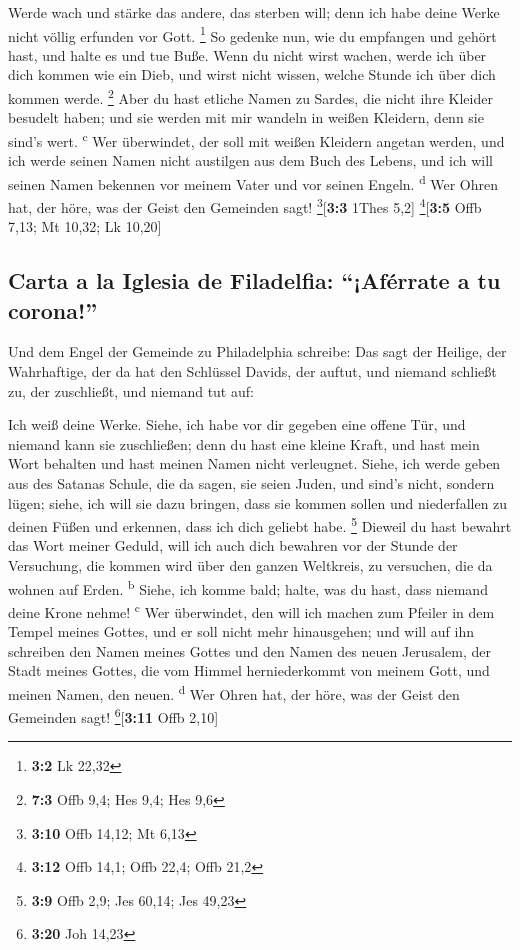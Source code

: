  Werde wach und stärke das andere, das sterben will; denn
ich habe deine Werke nicht völlig erfunden vor Gott. \footnote{\textbf{3:2}
  Lk 22,32}  So gedenke nun, wie du empfangen und gehört
hast, und halte es und tue Buße. Wenn du nicht wirst wachen, werde ich
über dich kommen wie ein Dieb, und wirst nicht wissen, welche Stunde ich
über dich kommen werde. \footnote{\textbf{7:3} Offb 9,4; Hes 9,4; Hes
  9,6}  Aber du hast etliche Namen zu Sardes, die nicht
ihre Kleider besudelt haben; und sie werden mit mir wandeln in weißen
Kleidern, denn sie sind's wert. \textsuperscript{c}  Wer
überwindet, der soll mit weißen Kleidern angetan werden, und ich werde
seinen Namen nicht austilgen aus dem Buch des Lebens, und ich will
seinen Namen bekennen vor meinem Vater und vor seinen Engeln.
\textsuperscript{d}  Wer Ohren hat, der höre, was der
Geist den Gemeinden sagt! \footnote{\textbf{3:10} Offb 14,12; Mt 6,13}{[}\textbf{3:3}
1Thes 5,2{]} \footnote{\textbf{3:12} Offb 14,1; Offb 22,4; Offb 21,2}{[}\textbf{3:5}
Offb 7,13; Mt 10,32; Lk 10,20{]}

\hypertarget{carta-a-la-iglesia-de-filadelfia-afuxe9rrate-a-tu-corona}{%
\subsection{Carta a la Iglesia de Filadelfia: ``¡Aférrate a tu
corona!''}\label{carta-a-la-iglesia-de-filadelfia-afuxe9rrate-a-tu-corona}}

 Und dem Engel der Gemeinde zu Philadelphia schreibe: Das
sagt der Heilige, der Wahrhaftige, der da hat den Schlüssel Davids, der
auftut, und niemand schließt zu, der zuschließt, und niemand tut auf:

 Ich weiß deine Werke. Siehe, ich habe vor dir gegeben
eine offene Tür, und niemand kann sie zuschließen; denn du hast eine
kleine Kraft, und hast mein Wort behalten und hast meinen Namen nicht
verleugnet.  Siehe, ich werde geben aus des Satanas
Schule, die da sagen, sie seien Juden, und sind's nicht, sondern lügen;
siehe, ich will sie dazu bringen, dass sie kommen sollen und
niederfallen zu deinen Füßen und erkennen, dass ich dich geliebt habe.
\footnote{\textbf{3:9} Offb 2,9; Jes 60,14; Jes 49,23} 
Dieweil du hast bewahrt das Wort meiner Geduld, will ich auch dich
bewahren vor der Stunde der Versuchung, die kommen wird über den ganzen
Weltkreis, zu versuchen, die da wohnen auf Erden. \textsuperscript{b}
 Siehe, ich komme bald; halte, was du hast, dass niemand
deine Krone nehme! \textsuperscript{c}  Wer überwindet,
den will ich machen zum Pfeiler in dem Tempel meines Gottes, und er soll
nicht mehr hinausgehen; und will auf ihn schreiben den Namen meines
Gottes und den Namen des neuen Jerusalem, der Stadt meines Gottes, die
vom Himmel herniederkommt von meinem Gott, und meinen Namen, den neuen.
\textsuperscript{d}  Wer Ohren hat, der höre, was der
Geist den Gemeinden sagt! \footnote{\textbf{3:20} Joh 14,23}{[}\textbf{3:11}
Offb 2,10{]}

